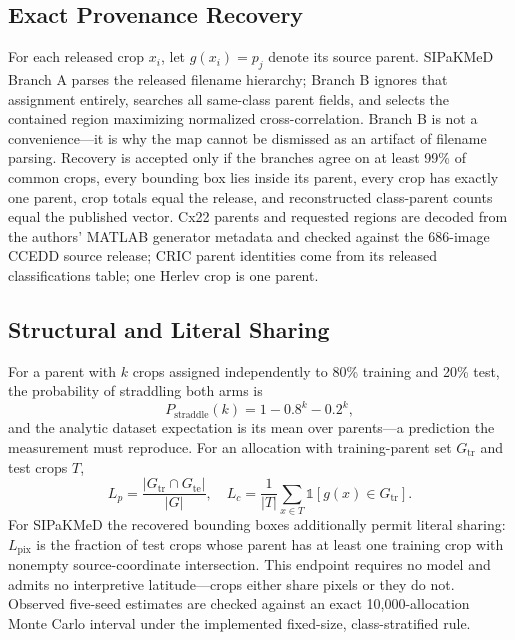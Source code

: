 \documentclass[conference]{IEEEtran}
\begin{document}
\subsection{Exact Provenance Recovery}
For each released crop $x_i$, let $g(x_i)=p_j$ denote its source parent.
SIPaKMeD Branch A parses the released filename hierarchy; Branch B ignores that assignment entirely, searches all same-class parent fields, and selects the contained region maximizing normalized cross-correlation.
Branch B is not a convenience---it is why the map cannot be dismissed as an artifact of filename parsing.
Recovery is accepted only if the branches agree on at least 99\% of common crops, every bounding box lies inside its parent, every crop has exactly one parent, crop totals equal the release, and reconstructed class-parent counts equal the published vector.
Cx22 parents and requested regions are decoded from the authors' MATLAB generator metadata and checked against the 686-image CCEDD source release; CRIC parent identities come from its released classifications table; one Herlev crop is one parent.

\subsection{Structural and Literal Sharing}
For a parent with $k$ crops assigned independently to 80\% training and 20\% test, the probability of straddling both arms is
\begin{equation}
P_{\mathrm{straddle}}(k)=1-0.8^k-0.2^k,
\label{eq:straddle}
\end{equation}
and the analytic dataset expectation is its mean over parents---a prediction the measurement must reproduce.
For an allocation with training-parent set $G_{\mathrm{tr}}$ and test crops $T$,
\begin{equation}
L_{p}=\frac{|G_{\mathrm{tr}}\cap G_{\mathrm{te}}|}{|G|},\quad
L_{c}=\frac{1}{|T|}\sum_{x\in T}\mathbb{1}[g(x)\in G_{\mathrm{tr}}].
\label{eq:leakage}
\end{equation}
For SIPaKMeD the recovered bounding boxes additionally permit literal sharing: $L_{\mathrm{pix}}$ is the fraction of test crops whose parent has at least one training crop with nonempty source-coordinate intersection.
This endpoint requires no model and admits no interpretive latitude---crops either share pixels or they do not.
Observed five-seed estimates are checked against an exact 10,000-allocation Monte Carlo interval under the implemented fixed-size, class-stratified rule.
\end{document}
